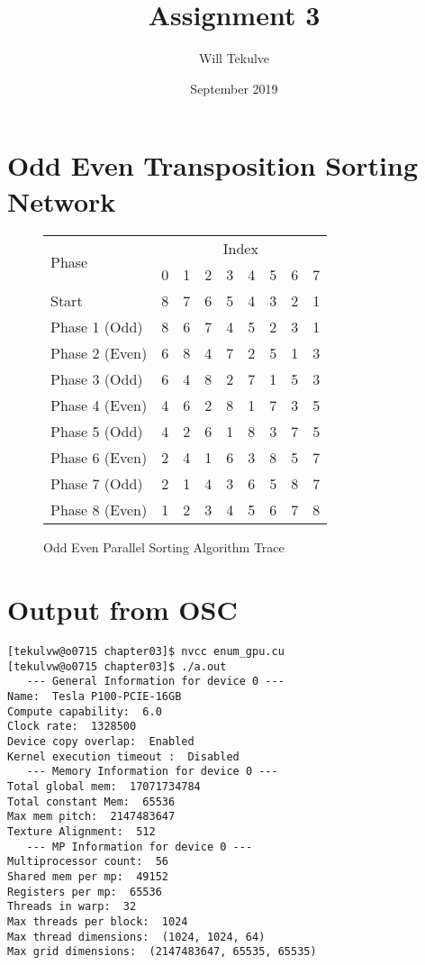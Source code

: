 \documentclass[12pt]{scrartcl}
\title{Assignment 3}
\author{Will Tekulve}
\date{September 2019}
\begin{document}
\maketitle

\section{Odd Even Transposition Sorting Network}

\begin{figure}[h]
    \centering
    \begin{tabular}{l|rrrrrrrr} \toprule
        \multirow{2}{*}{Phase} & \multicolumn{8}{c}{Index} \\
        & 0 & 1 & 2 & 3 & 4 & 5 & 6 & 7  \\ \midrule
        Start & 8 & 7 & 6 & 5 & 4 & 3 & 2 & 1   \\
        Phase 1 (Odd) & 8 & 6 & 7 & 4 & 5 & 2 & 3 & 1 \\
        Phase 2 (Even) & 6 & 8 & 4 & 7 & 2 & 5 & 1 & 3 \\
        Phase 3 (Odd) & 6 & 4 & 8 & 2 & 7 & 1 & 5 & 3 \\
        Phase 4 (Even) & 4 & 6 & 2 & 8 & 1 & 7 & 3 & 5 \\
        Phase 5 (Odd) & 4 & 2 & 6 & 1 & 8 & 3 & 7 & 5 \\
        Phase 6 (Even) & 2 & 4 & 1 & 6 & 3 & 8 & 5 & 7 \\
        Phase 7 (Odd) & 2 & 1 & 4 & 3 & 6 & 5 & 8 & 7 \\
        Phase 8 (Even) & 1 & 2 & 3 & 4 & 5 & 6 & 7 & 8 \\
        \bottomrule
    \end{tabular}
    \caption{Odd Even Parallel Sorting Algorithm Trace}
\end{figure}

\section{Output from OSC}

\begin{verbatim}
[tekulvw@o0715 chapter03]$ nvcc enum_gpu.cu
[tekulvw@o0715 chapter03]$ ./a.out
   --- General Information for device 0 ---
Name:  Tesla P100-PCIE-16GB
Compute capability:  6.0
Clock rate:  1328500
Device copy overlap:  Enabled
Kernel execution timeout :  Disabled
   --- Memory Information for device 0 ---
Total global mem:  17071734784
Total constant Mem:  65536
Max mem pitch:  2147483647
Texture Alignment:  512
   --- MP Information for device 0 ---
Multiprocessor count:  56
Shared mem per mp:  49152
Registers per mp:  65536
Threads in warp:  32
Max threads per block:  1024
Max thread dimensions:  (1024, 1024, 64)
Max grid dimensions:  (2147483647, 65535, 65535)
\end{verbatim}
\end{document}
